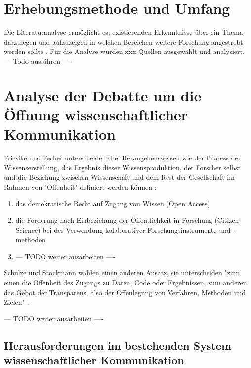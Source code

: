 \section{Erhebungsmethode und Umfang}

Die Literaturanalyse ermöglicht es, existierenden Erkenntnisse über ein Thema darzulegen und aufzuzeigen in welchen Bereichen weitere Forschung angestrebt werden sollte \cite{webster2002analyzing}. Für die Analyse wurden xxx Quellen ausgewählt und analysiert. --- Todo ausführen ----

\section{Analyse der Debatte um die Öffnung wissenschaftlicher Kommunikation}

Friesike und Fecher unterscheiden drei Herangehensweisen wie der Prozess der Wissenserstellung, das Ergebnis dieser Wissensproduktion, der Forscher selbst und die Beziehung zwischen Wissenschaft und dem Rest der Gesellschaft im Rahmen von "Offenheit" definiert werden können \cite{cite:9}:
\begin{enumerate}
\item das demokratische Recht auf Zugang von Wissen (Open Access)
\item die Forderung nach Einbeziehung der Öffentlichkeit in Forschung (Citizen Science) bei der Verwendung kolaborativer Forschungsinstrumente und -methoden
\item --- TODO weiter ausarbeiten ----
\end{enumerate}

Schulze und Stockmann wählen einen anderen Ansatz, sie unterscheiden "zum einen die Offenheit des Zugangs zu Daten, Code oder Ergebnissen, zum anderen das Gebot der Transparenz, also der Offenlegung von Verfahren, Methoden und Zielen" \cite{schulze_2013_open}.

--- TODO weiter ausarbeiten ----

\subsection{Herausforderungen im bestehenden System wissenschaftlicher Kommunikation}

